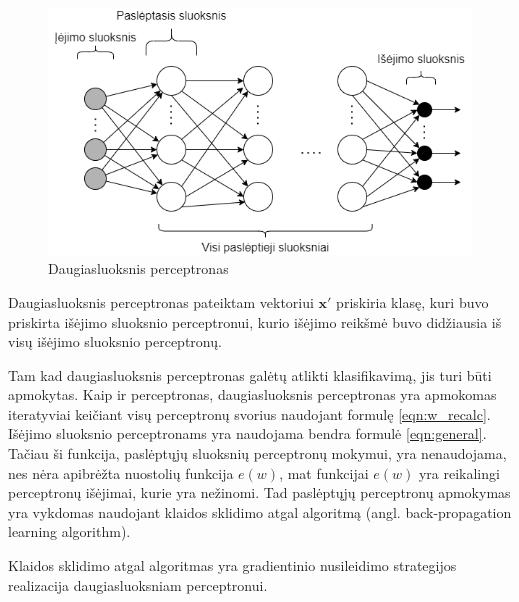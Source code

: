 \begin{figure}[H]
	\centering
	\includegraphics[scale=0.5]{img/neural_network.png}
	\caption{Daugiasluoksnis perceptronas}
	\label{img:nn}
\end{figure}

Daugiasluoksnis perceptronas pateiktam vektoriui $\boldsymbol{x}'$ priskiria klasę, kuri buvo priskirta išėjimo sluoksnio perceptronui, kurio išėjimo reikšmė buvo didžiausia iš visų išėjimo sluoksnio perceptronų.

Tam kad daugiasluoksnis perceptronas galėtų atlikti klasifikavimą, jis turi būti apmokytas. Kaip ir perceptronas, daugiasluoksnis perceptronas yra apmokomas iteratyviai keičiant visų perceptronų svorius naudojant formulę \ref{eqn:w_recalc}. Išėjimo sluoksnio perceptronams yra naudojama bendra formulė \ref{eqn:general}. Tačiau ši funkcija, paslėptųjų sluoksnių perceptronų mokymui, yra nenaudojama, nes nėra apibrėžta nuostolių funkcija $e(w)$, mat funkcijai $e(w)$ yra reikalingi perceptronų išėjimai, kurie yra nežinomi. Tad paslėptųjų perceptronų apmokymas yra vykdomas naudojant klaidos sklidimo atgal algoritmą (angl. back-propagation learning algorithm).

Klaidos sklidimo atgal algoritmas yra gradientinio nusileidimo strategijos realizacija daugiasluoksniam perceptronui.